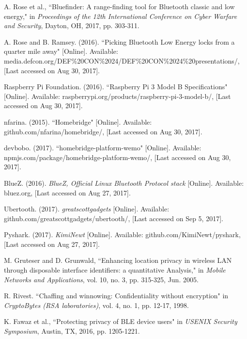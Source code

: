 \documentclass[conference]{./IEEEtran/IEEEtran}
\begin{document}
\begin{thebibliography}{1}
	A. Rose et al., ``Bluefinder: A range-finding tool for Bluetooth classic and low energy," in {\em Proceedings of the 12th International Conference on Cyber Warfare and Security}, Dayton, OH, 2017, pp. 303-311.
	
	A. Rose and B. Ramsey. (2016). ``Picking Bluetooth Low Energy locks from a quarter mile away" [Online]. Available: media.defcon.org/DEF\%20CON\%2024/DEF\%20CON\%2024\%20presentations/, [Last accessed on Aug 30, 2017].
	
	Raspberry Pi Foundation. (2016). ``Raspberry Pi 3 Model B Specifications" [Online]. Available:  raspberrypi.org/products/raspberry-pi-3-model-b/, [Last accessed on Aug 30, 2017].
	
	nfarina. (2015). ``Homebridge" [Online]. Available: github.com/nfarina/homebridge/, [Last accessed on Aug 30, 2017].
	
	devbobo. (2017). ``homebridge-platform-wemo" [Online]. Available: npmjs.com/package/homebridge-platform-wemo/, [Last accessed on Aug 30, 2017].

	BlueZ. (2016). {\em BlueZ, Official Linux Bluetooth Protocol stack} [Online]. Available: bluez.org, [Last accessed on Aug 27, 2017].

	Ubertooth. (2017). {\em greatscottgadgets} [Online]. Available: github.com/greatscottgadgets/ubertooth/, [Last accessed on Sep 5, 2017].
	
	Pyshark. (2017). {\em KimiNewt} [Online]. Available: github.com/KimiNewt/pyshark, [Last accessed on Aug 27, 2017].
	
	M. Gruteser and D. Grunwald, ``Enhancing location privacy in wireless LAN through disposable interface identifiers: a quantitative Analysis," in {\em Mobile Networks and Applications}, vol. 10, no. 3, pp. 315-325, Jun. 2005.
	
	R. Rivest. ``Chaffing and winnowing: Confidentiality without encryption" in {\em CryptoBytes (RSA laboratories)}, vol. 4, no. 1, pp. 12-17, 1998.
	
	K. Fawaz et al., ``Protecting privacy of \ac{BLE} device users" in {\em USENIX Security Symposium}, Austin, TX, 2016, pp. 1205-1221.
	
	
	
	
	
	


	
\end{thebibliography}
\end{document}
